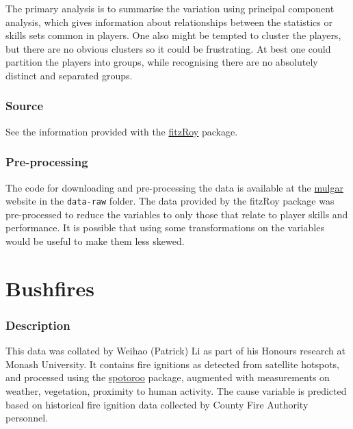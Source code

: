 \documentclass[
  letterpaper,
]{krantz}
\begin{document}
The primary analysis is to summarise the variation using principal
component analysis, which gives information about relationships between
the statistics or skills sets common in players. One also might be
tempted to cluster the players, but there are no obvious clusters so it
could be frustrating. At best one could partition the players into
groups, while recognising there are no absolutely distinct and separated
groups.

\subsubsection*{Source}\label{source}

See the information provided with the
\href{https://jimmyday12.github.io/fitzRoy/}{fitzRoy} package.

\subsubsection*{Pre-processing}\label{pre-processing}

The code for downloading and pre-processing the data is available at the
\href{https://dicook.github.io/mulgar/}{mulgar} website in the
\texttt{data-raw} folder. The data provided by the fitzRoy package was
pre-processed to reduce the variables to only those that relate to
player skills and performance. It is possible that using some
transformations on the variables would be useful to make them less
skewed.

\section{Bushfires}\label{bushfires}

\subsubsection*{Description}\label{description-1}

This data was collated by Weihao (Patrick) Li as part of his Honours
research at Monash University. It contains fire ignitions as detected
from satellite hotspots, and processed using the
\href{https://tengmcing.github.io/spotoroo/}{spotoroo} package,
augmented with measurements on weather, vegetation, proximity to human
activity. The cause variable is predicted based on historical fire
ignition data collected by County Fire Authority personnel.
\end{document}
